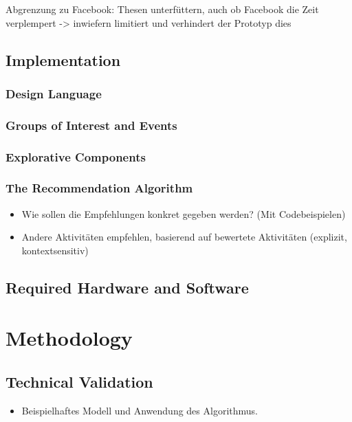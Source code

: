 \documentclass[12pt,numbers=noenddot,parskip,bibliography=totocnumbered,listof=totocnumbered]{scrreprt}
\begin{document}

Abgrenzung zu Facebook: Thesen unterfüttern, auch ob Facebook die Zeit verplempert -> inwiefern limitiert und verhindert der Prototyp dies
\section{Implementation}

\subsection{Design Language}

\subsection{Groups of Interest and Events}

\subsection{Explorative Components}

\subsection{The Recommendation Algorithm}
\begin{itemize} 
	\item Wie sollen die Empfehlungen konkret gegeben werden? (Mit Codebeispielen)
	\item Andere Aktivitäten empfehlen, basierend auf bewertete Aktivitäten (explizit, kontextsensitiv)
\end{itemize} 
	
\section{Required Hardware and Software}

\chapter{Methodology}

\section{Technical Validation}
\begin{itemize} 
	\item Beispielhaftes Modell und Anwendung des Algorithmus.
\end{itemize} 
\end{document}
